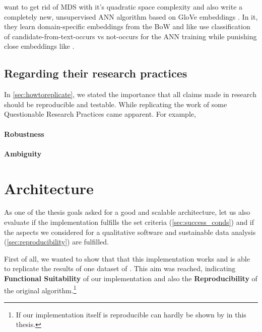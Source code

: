 \cite{Alshaikh2021} want to get rid of MDS with it's quadratic space complexity and also write a completely new, unsupervised ANN algorithm based on GloVe embeddings \cite{pennington2014glove}. In it, they learn domain-specific embeddings from the BoW and like \cite{Derrac2015} use classification of candidate-from-text-occurs vs not-occurs for the ANN training while punishing close embeddings like \cite{Alshaikh2019}.


\subsection{Regarding their research practices}

In \autoref{sec:howtoreplicate}, we stated the importance that all claims made in research should be reproducible and testable. While replicating the work of \cite{Derrac2015}some Questionable Research Practices came apparent. For example, 



\paragraph{Robustness}
\todo

\paragraph{Ambiguity}
\todo








\section{Architecture}

As one of the thesis goals asked for a good and scalable architecture, let us also evaluate if the implementation fulfills the set criteria (\autoref{sec:success_conds}) and if the aspects we considered for a qualitative software and sustainable data analysis (\autoref{sec:reproducibility}) are fulfilled.

First of all, we wanted to show that that this implementation works and is able to replicate the results of one dataset of \mainalgos. This aim was reached, indicating \textbf{Functional Suitability} of our implementation and also the \textbf{Reproducibility} of the original algorithm.\footnote{If our implementation itself is reproducible can hardly be shown by \me in this thesis.}

